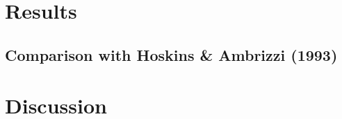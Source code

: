 \documentclass[]{article}
\begin{document}
	\section{Results}

	

	
	\subsection{Comparison with Hoskins \& Ambrizzi (1993)}
	
	\section{Discussion}



\end{document}
